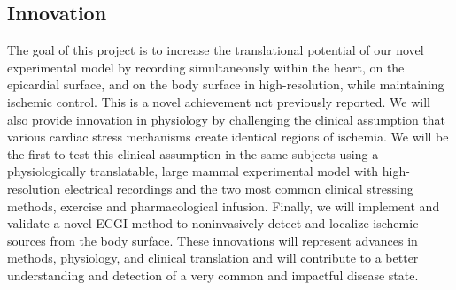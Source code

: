 %
\subsection{Innovation}
\label{sec:innov}

The goal of this project is to increase the
translational potential of our novel experimental model by recording
simultaneously within the heart, on the epicardial surface, and on the
body surface in high-resolution, while maintaining ischemic control. This
is a novel achievement not previously reported. We will also
provide innovation in physiology by challenging the clinical
assumption that various cardiac stress mechanisms create identical regions
of ischemia. We will be the first to test this clinical assumption in
the same subjects using a physiologically translatable,
large mammal experimental model with high-resolution electrical recordings and the two most common clinical
stressing methods, exercise and pharmacological infusion. Finally, we will
implement and validate a novel ECGI method to noninvasively detect and
localize ischemic sources from the body surface. These innovations will
represent advances in methods, physiology, and clinical translation and
will contribute to a better understanding and detection of a very common and impactful disease state.
